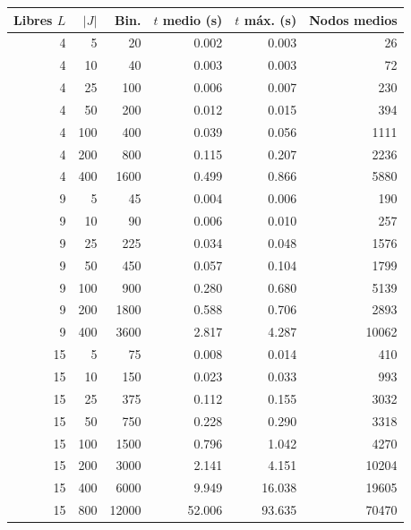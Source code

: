 \begin{tabular}{|r|r|r|r|r|r|}
\hline
\textbf{Libres $L$} & \textbf{$|J|$} & \textbf{Bin.} & \textbf{$t$ medio (s)} & \textbf{$t$ máx. (s)} & \textbf{Nodos medios} \\ \hline
4 & 5 & 20 & 0.002 & 0.003 & 26 \\ \hline
4 & 10 & 40 & 0.003 & 0.003 & 72 \\ \hline
4 & 25 & 100 & 0.006 & 0.007 & 230 \\ \hline
4 & 50 & 200 & 0.012 & 0.015 & 394 \\ \hline
4 & 100 & 400 & 0.039 & 0.056 & 1111 \\ \hline
4 & 200 & 800 & 0.115 & 0.207 & 2236 \\ \hline
4 & 400 & 1600 & 0.499 & 0.866 & 5880 \\ \hline
9 & 5 & 45 & 0.004 & 0.006 & 190 \\ \hline
9 & 10 & 90 & 0.006 & 0.010 & 257 \\ \hline
9 & 25 & 225 & 0.034 & 0.048 & 1576 \\ \hline
9 & 50 & 450 & 0.057 & 0.104 & 1799 \\ \hline
9 & 100 & 900 & 0.280 & 0.680 & 5139 \\ \hline
9 & 200 & 1800 & 0.588 & 0.706 & 2893 \\ \hline
9 & 400 & 3600 & 2.817 & 4.287 & 10062 \\ \hline
15 & 5 & 75 & 0.008 & 0.014 & 410 \\ \hline
15 & 10 & 150 & 0.023 & 0.033 & 993 \\ \hline
15 & 25 & 375 & 0.112 & 0.155 & 3032 \\ \hline
15 & 50 & 750 & 0.228 & 0.290 & 3318 \\ \hline
15 & 100 & 1500 & 0.796 & 1.042 & 4270 \\ \hline
15 & 200 & 3000 & 2.141 & 4.151 & 10204 \\ \hline
15 & 400 & 6000 & 9.949 & 16.038 & 19605 \\ \hline
15 & 800 & 12000 & 52.006 & 93.635 & 70470 \\ \hline
\end{tabular}
